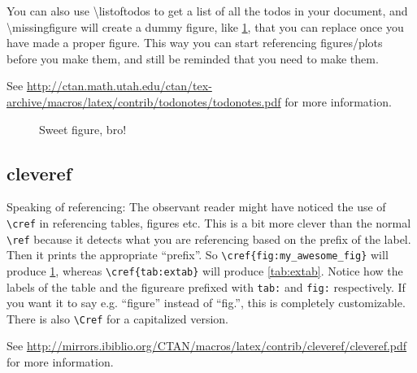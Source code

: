 You can also use \textbackslash{listoftodos} to get a list of all the todos in your document, and \textbackslash{missingfigure} will create a dummy figure, like \cref{fig:my_awesome_fig}, that you can replace once you have made a proper figure. This way you can start referencing figures/plots before you make them, and still be reminded that you need to make them.

See \url{http://ctan.math.utah.edu/ctan/tex-archive/macros/latex/contrib/todonotes/todonotes.pdf} for more information.
\begin{figure}[h]
  \centering
  \caption{Sweet figure, bro!}
  \label{fig:my_awesome_fig}
\end{figure}

\subsection{cleveref}
Speaking of referencing: The observant reader might have noticed the use of \texttt{\textbackslash{cref}} in referencing tables, figures etc. This is a bit more clever than the normal \texttt{\textbackslash{ref}} because it detects what you are referencing based on the prefix of the label. Then it prints the appropriate ``prefix''. So \texttt{\textbackslash{cref}\{fig:my\_awesome\_fig\}} will produce \cref{fig:my_awesome_fig}, whereas \texttt{\textbackslash{cref}\{tab:extab\}} will produce \cref{tab:extab}. Notice how the labels of the table and the figureare prefixed with \texttt{tab:} and \texttt{fig:} respectively. If you want it to say e.g. ``figure'' instead of ``fig.'', this is completely customizable. There is also \texttt{\textbackslash{Cref}} for a capitalized version.

See \url{http://mirrors.ibiblio.org/CTAN/macros/latex/contrib/cleveref/cleveref.pdf} for more information.
